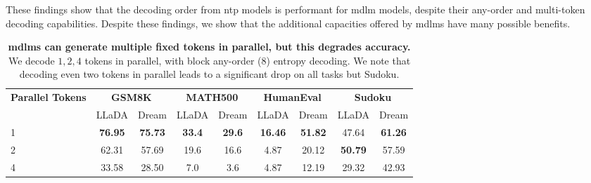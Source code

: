 These findings show that the decoding order from \gls{ntp} models is performant for \gls{mdlm} models, despite their any-order and multi-token decoding capabilities. Despite these findings, we show that the additional capacities offered by \glspl{mdlm} have many possible benefits. 

\begin{table}[t]
    \centering
    \begin{tabular}{lcccccccc}
    \toprule
       \textbf{Parallel Tokens}  
       & \multicolumn{2}{c}{\textbf{GSM8K}} 
       & \multicolumn{2}{c}{\textbf{MATH500}}  
       & \multicolumn{2}{c}{\textbf{HumanEval}}  
       & \multicolumn{2}{c}{\textbf{Sudoku}} \\    
    \cmidrule(lr){2-3} \cmidrule(lr){4-5} \cmidrule(lr){6-7} \cmidrule(lr){8-9}
       & LLaDA & Dream 
       & LLaDA & Dream 
       & LLaDA & Dream 
       & LLaDA & Dream \\
    \midrule       
        1       & \textbf{76.95}  &  \textbf{75.73}  & \textbf{33.4}  & \textbf{29.6}  & \textbf{16.46}  & \textbf{51.82}  & 47.64 & \textbf{61.26} \\
        2       & 62.31  & 57.69  & 19.6  & 16.6  & 4.87  & 20.12  & \textbf{50.79} & 57.59 \\
        4       & 33.58  & 28.50  & 7.0   & 3.6   & 4.87  & 12.19  & 29.32  & 42.93 \\
    \bottomrule        
    \end{tabular}
    \caption{\textbf{\glspl{mdlm} can generate multiple fixed tokens in parallel, but this degrades accuracy.} We decode $1,2,4$ tokens in parallel, with block any-order (8) entropy decoding. We note that decoding even two tokens in parallel leads to a significant drop on all tasks but Sudoku.}
    \label{tab:parallel_decoding}
\end{table}
